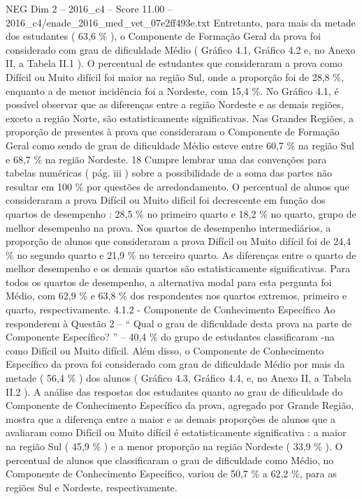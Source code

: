 \begin{textsample}{NEG Dim 2 – 2016\_c4 – Score 11.00 – 2016\_c4/enade\_2016\_med\_vet\_07e2ff493e.txt}
Entretanto, para mais da metade dos estudantes ( 63,6 \% ), o Componente de Formação Geral da prova foi considerado com grau de dificuldade Médio ( Gráfico 4.1, Gráfico 4.2 e, no Anexo II, a Tabela II.1 ).
O percentual de estudantes que consideraram a prova como Difícil ou Muito difícil foi maior na região Sul, onde a proporção foi de 28,8 \%, enquanto a de menor incidência foi a Nordeste, com 15,4 \%.
No Gráfico 4.1, é possível observar que as diferenças entre a região Nordeste e as demais regiões, exceto a região Norte, são estatisticamente significativas.
Nas Grandes Regiões, a proporção de presentes à prova que consideraram o Componente de Formação Geral como sendo de grau de dificuldade Médio esteve entre 60,7 \% na região Sul e 68,7 \% na região Nordeste. 18 Cumpre lembrar uma das convenções para tabelas numéricas ( pág. iii ) sobre a possibilidade de a soma das partes não resultar em 100 \% por questões de arredondamento.
O percentual de alunos que consideraram a prova Difícil ou Muito difícil foi decrescente em função dos quartos de desempenho : 28,5 \% no primeiro quarto e 18,2 \% no quarto, grupo de melhor desempenho na prova.
Nos quartos de desempenho intermediários, a proporção de alunos que consideraram a prova Difícil ou Muito difícil foi de 24,4 \% no segundo quarto e 21,9 \% no terceiro quarto.
As diferenças entre o quarto de melhor desempenho e os demais quartos são estatisticamente significativas.
Para todos os quartos de desempenho, a alternativa modal para esta pergunta foi Médio, com 62,9 \% e 63,8 \% dos respondentes nos quartos extremos, primeiro e quarto, respectivamente. 4.1.2 - Componente de Conhecimento Específico Ao responderem à Questão 2 – “ Qual o grau de dificuldade desta prova na parte de Componente Específico? ” – 40,4 \% do grupo de estudantes classificaram -na como Difícil ou Muito difícil.
Além disso, o Componente de Conhecimento Específico da prova foi considerado com grau de dificuldade Médio por mais da metade ( 56,4 \% ) dos alunos ( Gráfico 4.3, Gráfico 4.4, e, no Anexo II, a Tabela II.2 ).
A análise das respostas dos estudantes quanto ao grau de dificuldade do Componente de Conhecimento Específico da prova, agregado por Grande Região, mostra que a diferença entre a maior e as demais proporções de alunos que a avaliaram como Difícil ou Muito difícil é estatisticamente significativa : a maior na região Sul ( 45,9 \% ) e a menor proporção na região Nordeste ( 33,9 \% ).
O percentual de alunos que classificaram o grau de dificuldade como Médio, no Componente de Conhecimento Específico, variou de 50,7 \% a 62,2 \%, para as regiões Sul e Nordeste, respectivamente.

\end{textsample}
